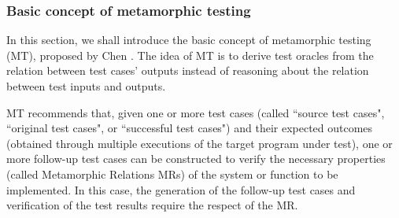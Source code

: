 \subsubsection{Basic concept of metamorphic testing}
In this section, we shall introduce the basic concept of metamorphic testing (MT), proposed by Chen \etal \cite{chen1998metamorphic}. The idea of MT is to derive test oracles from the relation between test cases' outputs instead of reasoning about the relation between test inputs and outputs. 

MT recommends that, given one or more test cases (called ``source test cases", ``original test cases", or ``successful test cases") and their expected outcomes (obtained through multiple executions of the target program under test), one or more follow-up test cases can be constructed to verify the necessary properties (called Metamorphic Relations MRs) of the system or function to be implemented. In this case, the generation of the follow-up test cases and verification of the test results require the respect of the MR.


